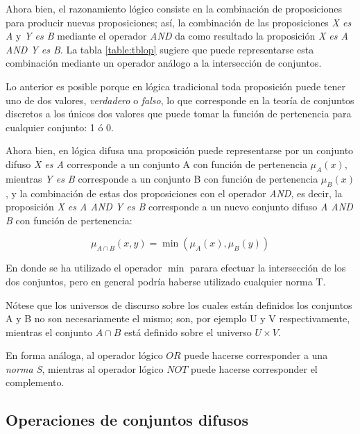 Ahora bien, el razonamiento lógico consiste en la combinación de proposiciones para producir nuevas proposiciones; así, la combinación de las proposiciones \textit{X es A} y  \textit{Y es B} mediante el operador \textit{AND} da como resultado la proposición \textit{X es A AND Y es B}. La tabla \ref{table:tblop} sugiere que puede representarse esta combinación mediante un operador análogo a la intersección de conjuntos.

Lo anterior es posible porque en lógica tradicional toda proposición puede tener uno de dos valores, \textit{verdadero} o \textit{falso}, lo que corresponde en la teoría de conjuntos discretos a los únicos dos valores que puede tomar la función de pertenencia para cualquier conjunto: 1 ó 0.


Ahora bien, en lógica difusa una proposición puede representarse por un conjunto difuso \textit{X es A} corresponde a un conjunto A con función de pertenencia $\mu_A(x)$, mientras \textit{Y es B} corresponde a un conjunto B con función de pertenencia $\mu_B(x)$, y la combinación de estas dos proposiciones con el operador \textit{AND}, es decir, la proposición \textit{X es A AND Y es B} corresponde a un nuevo conjunto difuso \textit{A AND B} con función de pertenencia:

\begin{displaymath}
\mu_{A \cap B}(x,y) =  \min(\mu_A(x),\mu_B(y))
\end{displaymath}

En donde se ha utilizado el operador $\min$ parara efectuar la intersección de los dos conjuntos, pero en general podría haberse utilizado cualquier norma T.

Nótese que los universos de discurso sobre los cuales están definidos los conjuntos A y B no son necesariamente el mismo; son, por ejemplo U y V respectivamente, mientras el conjunto $A \cap B$ está definido sobre el universo $U \times V$.

En forma análoga, al operador lógico $OR$ puede hacerse corresponder a una \textit{norma S}, mientras al operador lógico $NOT$ puede hacerse corresponder el complemento.









\subsection{Operaciones de conjuntos difusos}

